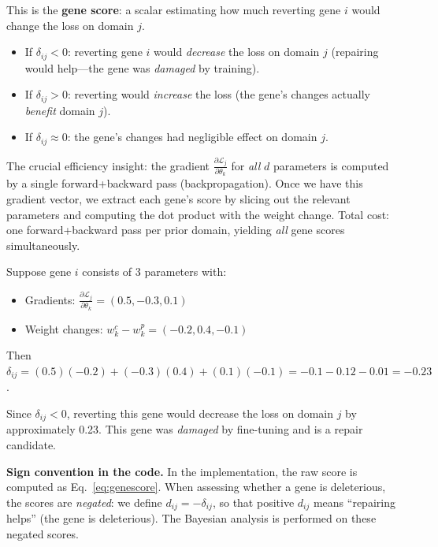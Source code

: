 \documentclass[11pt,letterpaper]{article}
\theoremstyle{definition}
\begin{document}
This is the \textbf{gene score}: a scalar estimating how much reverting gene $i$ would change the loss on domain $j$.

\begin{itemize}[nosep]
  \item If $\delta_{ij} < 0$: reverting gene $i$ would \emph{decrease} the loss on domain $j$ (repairing would help---the gene was \emph{damaged} by training).
  \item If $\delta_{ij} > 0$: reverting would \emph{increase} the loss (the gene's changes actually \emph{benefit} domain $j$).
  \item If $\delta_{ij} \approx 0$: the gene's changes had negligible effect on domain $j$.
\end{itemize}

\begin{tcolorbox}[keybox]
The crucial efficiency insight: the gradient $\frac{\partial \mathcal{L}_j}{\partial \theta_k}$ for \emph{all} $d$ parameters is computed by a single forward+backward pass (backpropagation). Once we have this gradient vector, we extract each gene's score by slicing out the relevant parameters and computing the dot product with the weight change. Total cost: one forward+backward pass per prior domain, yielding \emph{all} gene scores simultaneously.
\end{tcolorbox}

\begin{tcolorbox}[exbox]
Suppose gene $i$ consists of 3 parameters with:
\begin{itemize}[nosep]
  \item Gradients: $\frac{\partial \mathcal{L}_j}{\partial \theta_k} = (0.5, -0.3, 0.1)$
  \item Weight changes: $w^c_k - w^p_k = (-0.2, 0.4, -0.1)$
\end{itemize}
Then $\delta_{ij} = (0.5)(-0.2) + (-0.3)(0.4) + (0.1)(-0.1) = -0.1 - 0.12 - 0.01 = -0.23$.

Since $\delta_{ij} < 0$, reverting this gene would decrease the loss on domain $j$ by approximately 0.23. This gene was \emph{damaged} by fine-tuning and is a repair candidate.
\end{tcolorbox}

\textbf{Sign convention in the code.} In the implementation, the raw score is computed as Eq.~\ref{eq:genescore}. When assessing whether a gene is deleterious, the scores are \emph{negated}: we define $d_{ij} = -\delta_{ij}$, so that positive $d_{ij}$ means ``repairing helps'' (the gene is deleterious). The Bayesian analysis is performed on these negated scores.
\end{document}

